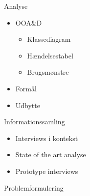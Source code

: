 \begin{frame}{Analyse}
\begin{itemize}
   \item OOA\&D
   \begin{itemize}
      \item Klassediagram
      \item Hændelsestabel
      \item Brugsmønstre
   \end{itemize}
   \item Formål %
   \item Udbytte %
\end{itemize}
\end{frame}

\begin{frame}{Informationssamling}
\begin{itemize}
   \item Interviews i kontekst
   \item State of the art analyse
   \item Prototype interviews
\end{itemize}
\end{frame}

\begin{frame}{Problemformulering}
\end{frame}